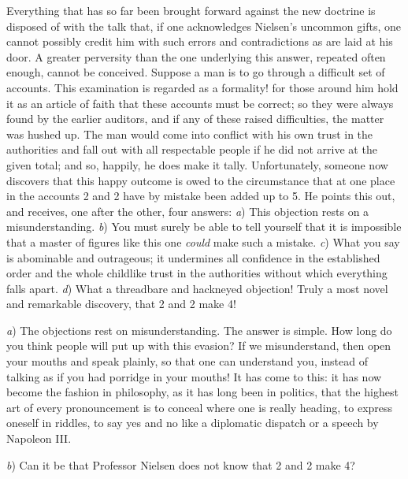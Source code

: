 \documentclass[12pt,a4paper,openany]{book}
\begin{document}
Everything that has so far been brought forward against the new doctrine
is disposed of with the talk that, if one acknowledges Nielsen's uncommon
gifts, one cannot possibly credit him with such errors and contradictions
as are laid at his door. A greater perversity than the one underlying
this answer, repeated often enough, cannot be conceived. Suppose a man is
to go through a difficult set of accounts. This examination is regarded
as a formality! for those around him hold it as an article of faith that
these accounts must be correct; so they were always found by the earlier
auditors, and if any of these raised difficulties, the matter was hushed
up. The man would come into conflict with his own trust in the
authorities and fall out with all respectable people if he did not
arrive at the given total; and so, happily, he does make it tally.
Unfortunately, someone now discovers that this happy outcome is owed to
the circumstance that at one place in the accounts 2 and 2 have by
mistake been added up to 5. He points this out, and receives, one after
the other, four answers: \emph{a}) This objection rests on a
misunderstanding. \emph{b}) You must surely be able to tell yourself that
it is impossible that a master of figures like this one \emph{could}
make such a mistake. \emph{c}) What you say is abominable and
outrageous; it undermines all confidence in the established order and
the whole childlike trust in the authorities without which everything
falls apart. \emph{d}) What a threadbare and hackneyed objection! Truly a
most novel and remarkable discovery, that 2 and 2 make 4!

\emph{a}) The objections rest on misunderstanding. The answer is simple.
How long do you think people will put up with this evasion? If we
misunderstand, then open your mouths and speak plainly, so that one can
understand you, instead of talking as if you had porridge in your
mouths! It has come to this: it has now become the fashion in
philosophy, as it has long been in politics, that the highest art of
every pronouncement is to conceal where one is really heading, to
express oneself in riddles, to say yes and no like a diplomatic dispatch
or a speech by Napoleon III.

\emph{b}) Can it be that Professor Nielsen does not know that 2 and 2 make 4?
\end{document}

